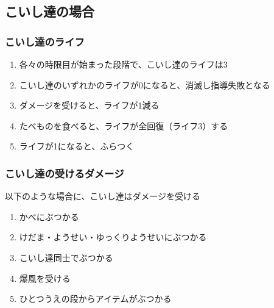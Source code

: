 \clearpage


\subsection{こいし達の場合}

\subsubsection{こいし達のライフ}
\begin{enumerate}[label={\sarrow}]
\item 各々の時限目が始まった段階で、こいし達のライフは3
\item こいし達のいずれかのライフが0になると、消滅し指導失敗となる
\item ダメージを受けると、ライフが1減る
\item たべものを食べると、ライフが全回復（ライフ3）する
\item ライフが1になると、ふらつく
\end{enumerate}

\subsubsection{こいし達の受けるダメージ}
以下のような場合に、こいし達はダメージを受ける
\begin{enumerate}[label={\sarrow}]
\item かべにぶつかる
\item けだま・ようせい・ゆっくりようせいにぶつかる
\item こいし達同士でぶつかる
\item 爆風を受ける
\item ひとつうえの段からアイテムがぶつかる
\end{enumerate}


